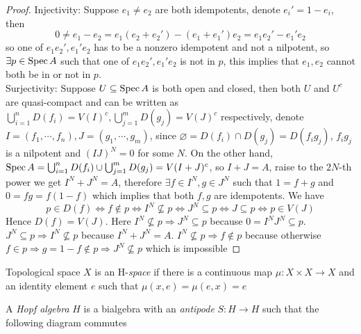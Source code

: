 \documentclass[main]{subfiles}
\begin{document}
\begin{proof}
Injectivity: Suppose $e_1\neq e_2$ are both idempotents, denote $e_i'=1-e_i$, then
\[
0\neq e_1-e_2=e_1(e_2+e_2')-(e_1+e_1')e_2=e_1e_2'-e_1'e_2
\]
so one of $e_1e_2',e_1'e_2$ has to be a nonzero idempotent and not a nilpotent, so $\exists p\in\operatorname{Spec} A$ such that one of $e_1e_2',e_1'e_2$ is not in $p$, this implies that $e_1,e_2$ cannot both be in or not in $p$. \\
Surjectivity: Suppose $U\subseteq\operatorname{Spec} A$ is both open and closed, then both $U$ and $U^c$ are quasi-compact and can be written as $\bigcup_{i=1}^nD(f_i)=V(I)^c,\bigcup_{j=1}^mD(g_j)=V(J)^c$ respectively, denote $I=(f_1,\cdots,f_n),J=(g_1,\cdots,g_m)$, since $\varnothing=D(f_i)\cap D(g_j)=D(f_ig_j)$, $f_ig_j$ is a nilpotent and $(IJ)^N=0$ for some $N$. On the other hand, $\operatorname{Spec} A=\bigcup_{i=1}^nD(f_i)\cup\bigcup_{j=1}^mD(g_j)=V(I+J)^c$, so $I+J=A$, raise to the $2N$-th power we get $I^N+J^N=A$, therefore $\exists f\in I^N,g\in J^N$ such that $1=f+g$ and $0=fg=f(1-f)$ which implies that both $f,g$ are idempotents. We have
\[
p\in D(f)\iff f\notin p\iff I^N\not\subseteq p\iff J^N\subseteq p\iff J\subseteq p\iff p\in V(J)
\]
Hence $D(f)=V(J)$. Here $I^N\not\subseteq p\Rightarrow J^N\subseteq p$ because $0=I^NJ^N\subseteq p$. $J^N\subseteq p\Rightarrow I^N\not\subseteq p$ because $I^N+J^N=A$. $I^N\not\subseteq p\Rightarrow f\notin p$ because otherwise $f\in p\Rightarrow g=1-f\notin p\Rightarrow J^N\not\subseteq p$ which is impossible
\end{proof}

\begin{definition}
Topological space $X$ is an H-\textit{space} if there is a continuous map $\mu:X\times X\to X$ and an identity element $e$ such that $\mu(x,e)=\mu(e,x)=e$
\end{definition}

\begin{definition}
A \textit{Hopf algebra} $H$ is a bialgebra with an \textit{antipode} $S:H\to H$ such that the following diagram commutes
\begin{center}
\end{center}
\end{definition}
\end{document}
